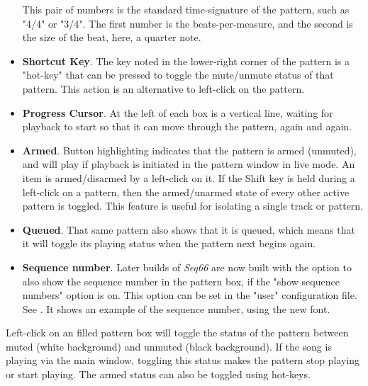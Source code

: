 \begin{itemize}
         This pair of numbers is the standard time-signature of the pattern,
         such as "4/4" or "3/4".  The first number is the beats-per-measure,
         and the second is the size of the beat, here, a quarter note.
      \item \textbf{Shortcut Key}.
         The key noted in the lower-right corner of the pattern is a "hot-key"
         that can be pressed to toggle the mute/unmute status of that pattern.
         This action is an alternative to left-click on the pattern.
      \item \textbf{Progress Cursor}.
         At the left of each box is a vertical line, waiting for playback to
         start so that it can move through the pattern, again and again.
      \item \textbf{Armed}.
         Button highlighting indicates that the pattern is armed
         (unmuted), and will play if playback is initiated in the pattern
         window in live mode.
         An item is armed/disarmed by a left-click on it.
         If the Shift key is held during a left-click on a pattern, then
         the armed/unarmed state of every other active pattern is toggled.
         This feature is useful for isolating a single track or pattern.
      \item \textbf{Queued}.
         That same pattern also shows that it is queued, which means that it
         will toggle its playing status when the pattern next begins again.
      \item \textbf{Sequence number}.
         Later builds of \textsl{Seq66} are now built with the option to
         also show the sequence number in the pattern box, if the "show
         sequence numbers" option is on.
         This option can be set in the "user" configuration file.
         See .  It shows an
         example of the sequence number, using the new font.
   \end{itemize}

   Left-click on an filled pattern box will toggle the status of the
   pattern between muted (white background) and unmuted (black background).
   If the song is playing via the main window, toggling this status makes
   the pattern stop playing or start playing.  The armed status
   can also be toggled using hot-keys.

